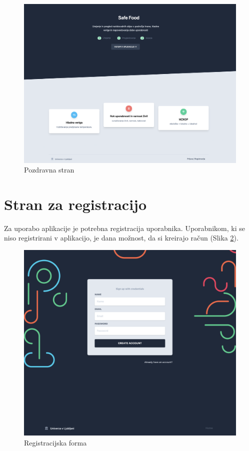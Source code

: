 \documentclass[a4paper, 12pt]{book}
\begin{document}
\begin{figure}[h]
\begin{center}
\includegraphics[width=1\textwidth]{slike/landing-page.png}
\end{center}
\caption{ Pozdravna stran }
\label{landing-page}
\end{figure}

\newpage
\section{Stran za registracijo}
\label{registration-page}
Za uporabo aplikacije je potrebna registracija uporabnika. Uporabnikom, ki se niso registrirani v aplikacijo, je dana možnost, da si kreirajo račun (Slika \ref{signup-form}).

\begin{figure}[h]
\begin{center}
\includegraphics[width=1\textwidth]{slike/signup.png}
\end{center}
\caption{ Registracijska forma }
\label{signup-form}
\end{figure}
\end{document}
